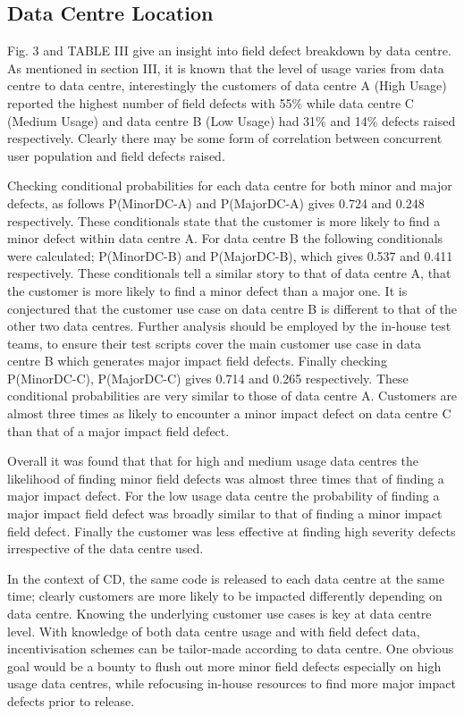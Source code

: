 \documentclass[conference]{IEEEtran}
\begin{document}
\subsection{Data Centre Location}
Fig. 3 and TABLE III give an insight into field defect breakdown by data centre. As mentioned in section III, it is known that the level of usage varies from data centre to data centre, interestingly the customers of data centre A (High Usage) reported the highest number of field defects with 55\% while data centre C (Medium Usage) and data centre B (Low Usage) had 31\% and 14\% defects raised respectively. Clearly there may be some form of correlation between concurrent user population and field defects raised. \par
Checking conditional probabilities for each data centre for both minor and major defects, as follows P(Minor\textbar DC-A) and P(Major\textbar DC-A) gives 0.724 and 0.248 respectively. These conditionals state that the customer is more likely to find a minor defect within data centre A. For data centre B  the following conditionals were calculated; P(Minor\textbar DC-B) and P(Major\textbar DC-B), which gives 0.537 and 0.411 respectively. These conditionals tell a similar story to that of data centre A, that the customer is more likely to find a minor defect than a major one. It is conjectured that the customer use case on data centre B is different to that of the other two data centres. Further analysis should be employed by the in-house test teams, to ensure their test scripts cover the main customer use case in data centre B which generates major impact field defects. Finally checking P(Minor\textbar DC-C), P(Major\textbar DC-C) gives 0.714 and 0.265 respectively. These conditional probabilities are very similar to those of data centre A. Customers are almost three times as likely to encounter a minor impact defect on data centre C than that of a major impact field defect. \par
Overall it was found that that for high and medium usage data centres the likelihood of finding minor field defects was almost three times that of finding a major impact defect. For the low usage data centre the probability of finding a major impact field defect was broadly similar to that of finding a minor impact field defect. Finally the customer was less effective at finding high severity defects irrespective of the data centre used. \par
In the context of CD, the same code is released to each data centre at the same time; clearly customers are more likely to be impacted differently depending on data centre. Knowing the underlying customer use cases is key at data centre level.
With knowledge of both data centre usage and with field defect data, incentivisation schemes can be tailor-made according to data centre. One obvious goal would be a bounty to flush out more minor field defects especially on high usage data centres, while refocusing in-house resources to find more major impact defects prior to release. 
\end{document}
